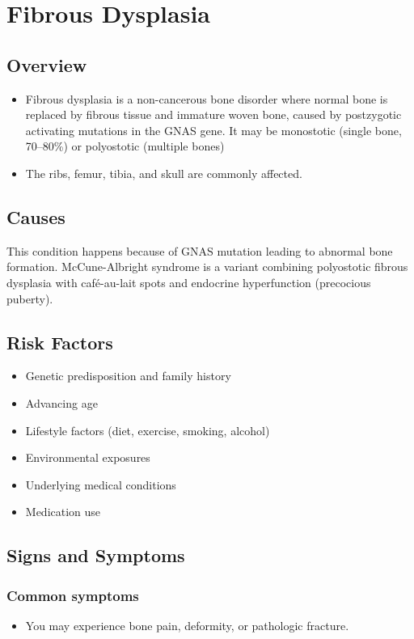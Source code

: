 \chapter{Fibrous Dysplasia}
\label{sec:Fibrous Dysplasia}

\section{Overview}


\begin{itemize}[noitemsep]
  \item Fibrous dysplasia is a non-cancerous bone disorder where normal bone is replaced by fibrous tissue and immature woven bone, caused by postzygotic activating mutations in the GNAS gene. It may be monostotic (single bone, 70--80\%) or polyostotic (multiple bones)
  \item The ribs, femur, tibia, and skull are commonly affected.
\end{itemize}
\section{Causes}
This condition happens because of GNAS mutation leading to abnormal bone formation. McCune-Albright syndrome is a variant combining polyostotic fibrous dysplasia with caf\'{e}-au-lait spots and endocrine hyperfunction (precocious puberty).     
\section{Risk Factors}

\begin{itemize}[noitemsep]
  \item Genetic predisposition and family history
  \item Advancing age
  \item Lifestyle factors (diet, exercise, smoking, alcohol)
  \item Environmental exposures
  \item Underlying medical conditions
  \item Medication use
\end{itemize}
\section{Signs and Symptoms}

\subsection{Common symptoms}
\begin{itemize}[noitemsep]
  \item You may experience bone pain, deformity, or pathologic fracture. 
  \end{itemize}

